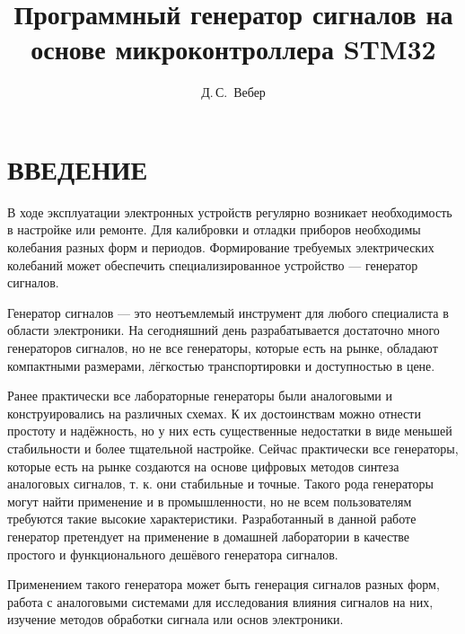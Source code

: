 \documentclass[14pt, oneside]{altsu-bachelor}
\title{Программный генератор сигналов на основе микроконтроллера STM32}
\author{Д.\,С.~Вебер}
\institute{Институт цифровых технологий, электроники и физики}
\date{\the\year}
\begin{document}
\maketitle

\setcounter{page}{2}
\makeabstract
\tableofcontents

\chapter*{ВВЕДЕНИЕ}
	В ходе эксплуатации электронных устройств регулярно возникает необходимость в настройке или ремонте. Для калибровки и отладки приборов необходимы колебания разных форм и периодов. Формирование требуемых электрических колебаний может обеспечить специализированное устройство --- генератор сигналов.
	
	Генератор сигналов --- это неотъемлемый инструмент для любого специалиста в области электроники. %
	На сегодняшний день разрабатывается достаточно много генераторов сигналов, %
	 но не все генераторы, которые есть на рынке, обладают компактными размерами, лёгкостью транспортировки и доступностью в цене. %
	
	Ранее практически все лабораторные генераторы были аналоговыми и конструировались на различных схемах. К их достоинствам можно отнести простоту и надёжность, но у них есть существенные недостатки в виде меньшей стабильности и более тщательной настройке. Сейчас практически все генераторы, которые есть на рынке создаются на основе цифровых методов синтеза аналоговых сигналов, %
	 т. к. они стабильные и точные. %
	 Такого рода генераторы могут найти применение и в промышленности, но не всем пользователям требуются такие высокие характеристики. Разработанный в данной работе генератор претендует на применение в домашней лаборатории в качестве простого и функционального дешёвого генератора сигналов.
	
	Применением такого генератора может быть генерация сигналов разных форм, работа с аналоговыми системами для исследования влияния сигналов на них, изучение методов обработки сигнала или основ электроники. 
	
\end{document}

